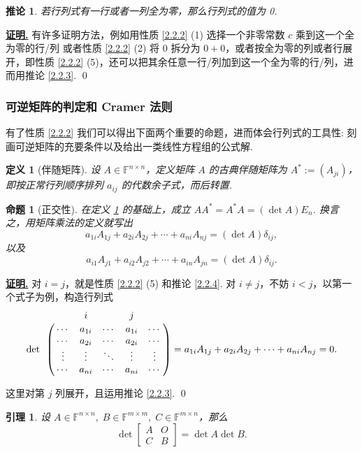 \documentclass[10pt,openany]{article}
\theoremstyle{thmstyle} %
\theoremstyle{defstyle} %
\newtheorem{definition}[theorem]{定义}
\newtheorem{lemma}[theorem]{引理}
\newtheorem{corollary}[theorem]{推论}
\theoremstyle{prostyle} %
\newtheorem{proposition}[theorem]{命题}
\theoremstyle{exastyle}
\theoremstyle{remstyle}
\renewenvironment{proof}[1][证明]{\par\underline{\textbf{#1.}} \;\fangsong}{\qed\par}
\newcommand{\F}{\mathbb{F}}
\newcommand{\n}{^{n \times n}}
\newcommand{\mn}{^{m \times n}}
\begin{document}
\begin{corollary}
	若行列式有一行或者一列全为零，那么行列式的值为 0.
	\label{2.2.5}
\end{corollary}

\begin{proof}
	有许多证明方法，例如用性质 \ref{2.2.2} (1) 选择一个非零常数 \( c \) 乘到这一个全为零的行/列 或者性质 \ref{2.2.2} (2) 将 \( 0 \) 拆分为 \( 0+0 \)，或者按全为零的列或者行展开，即性质 \ref{2.2.2} (5)，还可以把其余任意一行/列加到这一个全为零的行/列，进而用推论 \ref{2.2.3}. 
\end{proof}

\subsubsection{可逆矩阵的判定和 Cramer 法则}

有了性质 \ref{2.2.2} 我们可以得出下面两个重要的命题，进而体会行列式的工具性: 刻画可逆矩阵的充要条件以及给出一类线性方程组的公式解.

\begin{definition}[伴随矩阵]
	设 \( A \in \F\n \)，定义矩阵 \( A \) 的古典伴随矩阵为 \( A^*:=(A_{ji}) \)，即按正常行列顺序排列 \( a_{ij} \) 的代数余子式，而后转置. 
	\label{2.2.6}
\end{definition}

\begin{proposition}[正交性]
	在定义 \ref{2.2.6} 的基础上，成立 \( AA^*=A^*A=(\det A)E_n \). 换言之，用矩阵乘法的定义就写出
	\[ a_{1i}A_{1j}+a_{2i}A_{2j}+\cdots+a_{ni}A_{nj}=(\det A)\delta_{ij}, \]
	以及
	\[ a_{i1}A_{j1}+a_{i2}A_{j2}+\cdots+a_{in}A_{jn}=(\det A)\delta_{ij}. \]
	\label{2.2.7}
\end{proposition}

\begin{proof}
	对 \( i=j \)，就是性质 \ref{2.2.2} (5) 和推论 \ref{2.2.4}. 对 \( i \neq j \)，不妨 \( i<j \)，以第一个式子为例，构造行列式
	\[ \det \bordermatrix{
		& & i & & j &  \cr
		&\cdots & a_{1i} & \cdots & a_{1i} & \cdots \cr
		&\cdots & a_{2i} & \cdots & a_{2i} & \cdots \cr
		&\vdots & \vdots & \ddots & \vdots & \vdots \cr
		&\cdots & a_{ni} & \cdots & a_{ni} & \cdots 
	}= a_{1i}A_{1j}+a_{2i}A_{2j}+\cdots+a_{ni}A_{nj}=0. \]
	
	这里对第 \( j \) 列展开，且运用推论 \ref{2.2.3}.
\end{proof}

\begin{lemma}
	设 \( A \in \F\n, \; B \in \F^{m \times m}, \; C \in  \F\mn \)，那么
	\[ \det \begin{bmatrix}
		A & O \\
		C & B
	\end{bmatrix}= \det A \det B. \]
	\label{2.2.8}
\end{lemma}
\end{document}
